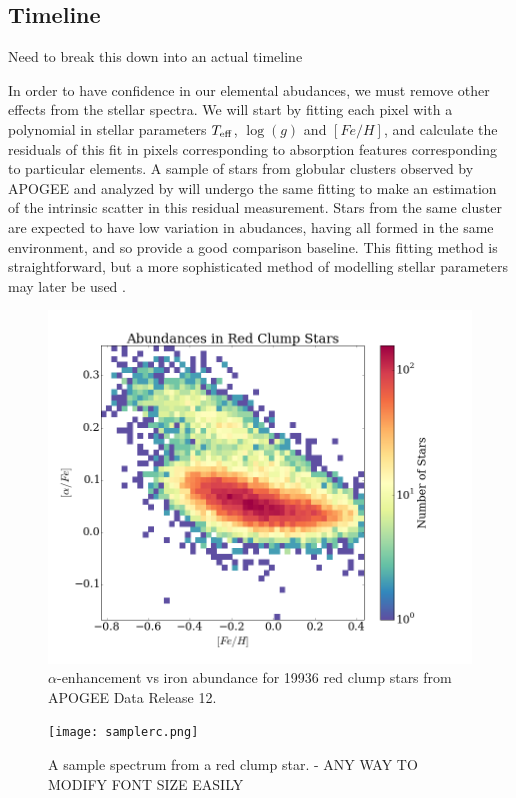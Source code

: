 \documentclass[preprint]{aastex}
\begin{document}
\subsection{Timeline}
\label{sec:timeline}

Need to break this down into an actual timeline

In order to have confidence in our elemental abudances, we must remove other effects from the stellar spectra. We will start by fitting each pixel with a polynomial in stellar parameters $T_{\rm eff}$, $\log(g)$ and $[Fe/H]$, and calculate the residuals of this fit in pixels corresponding to absorption features corresponding to particular elements. A sample of stars from globular clusters observed by APOGEE and analyzed by \citet{meszaros2015} will undergo the same fitting to make an estimation of the intrinsic scatter in this residual measurement. Stars from the same cluster are expected to have low variation in abudances, having all formed in the same environment, and so provide a good comparison baseline. This fitting method is straightforward, but a more sophisticated method of modelling stellar parameters may later be used \citep{ness2015}.

\begin{figure}%
\begin{centering}
\includegraphics[width = 0.8\linewidth]{alpha_vs_fe.png}
\caption{$\alpha$-enhancement vs iron abundance for 19936 red clump stars from APOGEE Data Release 12.}
\end{centering}
\label{fig:abun}
\end{figure}

\begin{figure}%
\begin{centering}
\texttt{[image: samplerc.png]}
\caption{A sample spectrum from a red clump star. - ANY WAY TO MODIFY FONT SIZE EASILY}
\end{centering}
\label{fig:rc}
\end{figure}



\end{document}
